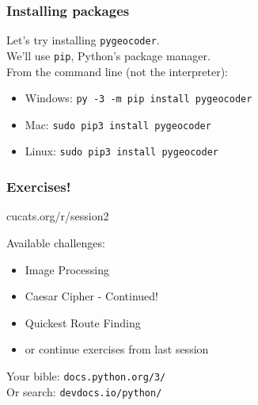 \documentclass[notes]{beamer}
\begin{document}
	\begin{frame}[fragile]
		\frametitle{Installing packages}
		Let's try installing \colorbox{codebg}{\lstinline|pygeocoder|}.\\
		\vspace{10pt}
		We'll use \colorbox{codebg}{\lstinline|pip|}, Python's package manager.\\
		\vspace{10pt}
		From the command line (not the interpreter):
		\begin{itemize}
			\item Windows: \colorbox{codebg}{\lstinline|py -3 -m pip install pygeocoder|}
			\item Mac: \colorbox{codebg}{\lstinline|sudo pip3 install pygeocoder|}
			\item Linux: \colorbox{codebg}{\lstinline|sudo pip3 install pygeocoder|}
		\end{itemize}
	\end{frame}

	\begin{frame}[fragile]
		\frametitle{Exercises!}
		\vfill
		\centerline{\LARGE cucats.org/r/session2}
		\vfill
		Available challenges:
		\begin{itemize}
			\item Image Processing
			\item Caesar Cipher - Continued!
			\item Quickest Route Finding
			\item or continue exercises from last session
		\end{itemize}
		\vspace{10pt}
		Your bible: \lstinline|docs.python.org/3/|\\
		Or search: \lstinline|devdocs.io/python/|
	\end{frame}
\end{document}
